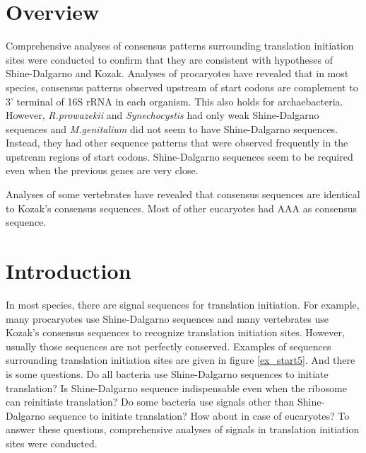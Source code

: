 
\section{Overview}

Comprehensive analyses of consensus patterns surrounding translation
initiation sites were conducted to confirm that they are consistent
with hypotheses of Shine-Dalgarno and Kozak. Analyses of procaryotes
have revealed that in most species, consensus patterns observed
upstream of start codons are complement to 3' terminal of 16S rRNA in
each organism. This also holds for archaebacteria. However, {\it
R.prowazekii} and {\it Synechocystis} had only weak Shine-Dalgarno
sequences and {\it M.genitalium} did not seem to have Shine-Dalgarno
sequences.  Instead, they had other sequence patterns that were
observed frequently in the upstream regions of start codons.
Shine-Dalgarno sequences seem to be required even when the previous
genes are very close.

Analyses of some vertebrates have revealed that consensus sequences
are identical to Kozak's consensus sequences. Most of other eucaryotes
had AAA as consensus sequence.

\section{Introduction}

In most species, there are signal sequences for translation
initiation. For example, many procaryotes use Shine-Dalgarno
sequences\cite{label7} and many vertebrates use Kozak's consensus
sequences\cite{label3} to recognize translation initiation
sites. However, usually those sequences are not perfectly
conserved. Examples of sequences surrounding translation initiation
sites are given in figure \ref{ex_start5}. And there is some
questions. Do all bacteria use Shine-Dalgarno sequences to initiate
translation? Is Shine-Dalgarno sequence indispensable even when the
ribosome can reinitiate translation? Do some bacteria use signals other
than Shine-Dalgarno sequence to initiate translation? How about in case
of eucaryotes? To answer these questions, comprehensive analyses of
signals in translation initiation sites were conducted.


